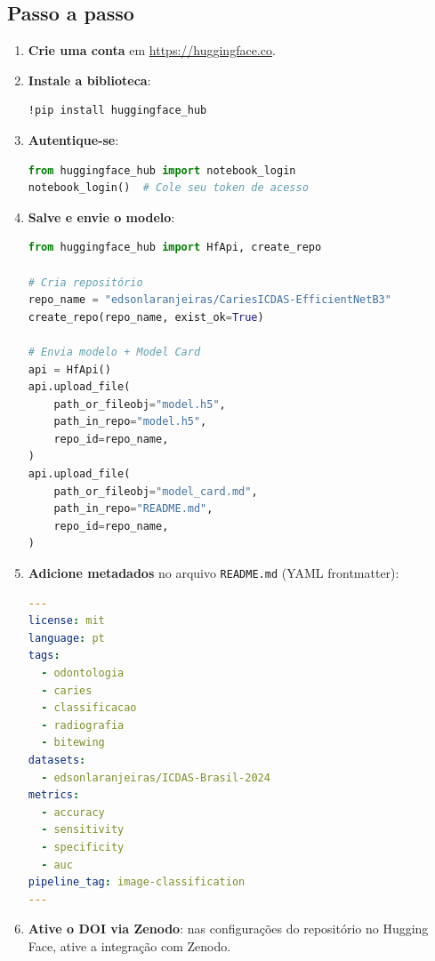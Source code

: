 \subsection{Passo a passo}

\begin{enumerate}
  \item \textbf{Crie uma conta} em \url{https://huggingface.co}.
  \item \textbf{Instale a biblioteca}:
\begin{lstlisting}[language=bash]
!pip install huggingface_hub
\end{lstlisting}

  \item \textbf{Autentique-se}:
\begin{lstlisting}[language=Python]
from huggingface_hub import notebook_login
notebook_login()  # Cole seu token de acesso
\end{lstlisting}

  \item \textbf{Salve e envie o modelo}:
\begin{lstlisting}[language=Python]
from huggingface_hub import HfApi, create_repo

# Cria repositório
repo_name = "edsonlaranjeiras/CariesICDAS-EfficientNetB3"
create_repo(repo_name, exist_ok=True)

# Envia modelo + Model Card
api = HfApi()
api.upload_file(
    path_or_fileobj="model.h5",
    path_in_repo="model.h5",
    repo_id=repo_name,
)
api.upload_file(
    path_or_fileobj="model_card.md",
    path_in_repo="README.md",
    repo_id=repo_name,
)
\end{lstlisting}

  \item \textbf{Adicione metadados} no arquivo \texttt{README.md} (YAML
    frontmatter):
\begin{lstlisting}[language=yaml]
---
license: mit
language: pt
tags:
  - odontologia
  - caries
  - classificacao
  - radiografia
  - bitewing
datasets:
  - edsonlaranjeiras/ICDAS-Brasil-2024
metrics:
  - accuracy
  - sensitivity
  - specificity
  - auc
pipeline_tag: image-classification
---
\end{lstlisting}

  \item \textbf{Ative o DOI via Zenodo}: nas configurações do repositório
    no Hugging Face, ative a integração com Zenodo.
\end{enumerate}


